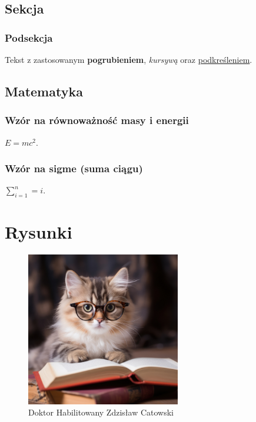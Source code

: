 \documentclass{article}
\begin{document}
\lipsum[1]

\subsection{Sekcja}

\subsubsection{Podsekcja}

\lipsum[1]

Tekst z zastosowanym \textbf{pogrubieniem}, \textit{kursywą} oraz \underline{podkreśleniem}.

\subsection{Matematyka}

\subsubsection{Wzór na równoważność masy i energii} 
$E=mc^2$.

\subsubsection{Wzór na sigme (suma ciągu)} 
$\sum_{i=1}^n=i$. \cite{autor2}

\section{Rysunki}

\begin{figure}[h]
    \centering
    \includegraphics[width=0.6\textwidth]{image2.png}
    \caption{Doktor Habilitowany Zdzisław Catowski}
    \label{fig:rys1}
\end{figure}
\end{document}
